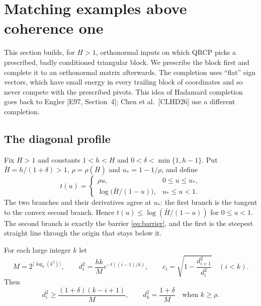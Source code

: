 \documentclass[11pt,a4paper]{article}
\theoremstyle{definition}
\numberwithin{equation}{section}
\begin{document}
\section{Matching examples above coherence one}\label{sec:lower}

This section builds, for $H>1$, orthonormal inputs on which QRCP picks a prescribed, badly conditioned triangular
block. We prescribe the block first and complete it to an orthonormal matrix afterwards. The completion uses
``flat'' sign vectors, which have small energy in every trailing block of coordinates and so never compete with
the prescribed pivots. This idea of Hadamard completion goes back to Engler [E97, Section~4]; Chen et al.\
[CLHD26] use a different completion.

\subsection{The diagonal profile}
Fix $H>1$ and constants $1<h<H$ and $0<\delta<\min\{1,h-1\}$. Put $\bar H=h/(1+\delta)>1$, $\rho=\rho(\bar H)$ and
$u_*=1-1/\rho$, and define
\begin{equation}\label{eq:profile}
 t(u)=\begin{cases}\rho u,&0\le u\le u_*,\\ \log\bigl(\bar H/(1-u)\bigr),&u_*\le u<1.\end{cases}
\end{equation}
The two branches and their derivatives agree at $u_*$: the first branch is the tangent to the convex second branch.
Hence $t(u)\le\log(\bar H/(1-u))$ for $0\le u<1$. The second branch is exactly the barrier \eqref{eq:barrier}, and
the first is the steepest straight line through the origin that stays below it.

For each large integer $k$ let
\begin{equation}\label{eq:dk}
 M=2^{\lceil\log_2(k^3)\rceil},\qquad d_i^2=\frac{hk}Me^{-t((i-1)/k)},\qquad c_i=\sqrt{1-\frac{d_{i+1}^2}{d_i^2}}\quad(i<k).
\end{equation}
Then
\begin{equation}\label{eq:dk-floor}
 d_i^2\ge\frac{(1+\delta)(k-i+1)}M,\qquad d_k^2=\frac{1+\delta}M\quad\text{when }k\ge\rho.
\end{equation}
\end{document}
